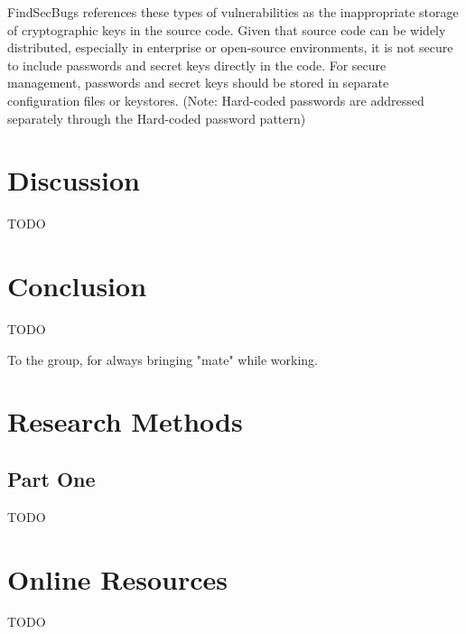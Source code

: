 \documentclass[sigconf]{acmart}
\begin{document}
FindSecBugs references these types of vulnerabilities as the inappropriate storage of cryptographic keys in the source code. Given that source code can be widely distributed, especially in enterprise or open-source environments, it is not secure to include passwords and secret keys directly in the code. For secure management, passwords and secret keys should be stored in separate configuration files or keystores. (Note: Hard-coded passwords are addressed separately through the Hard-coded password pattern)

\section{Discussion}
TODO

\section{Conclusion}
TODO

\begin{acks}
To the group, for always bringing "mate" while working.
\end{acks}





\appendix

\section{Research Methods}

\subsection{Part One}
TODO

\section{Online Resources}
TODO
\end{document}
